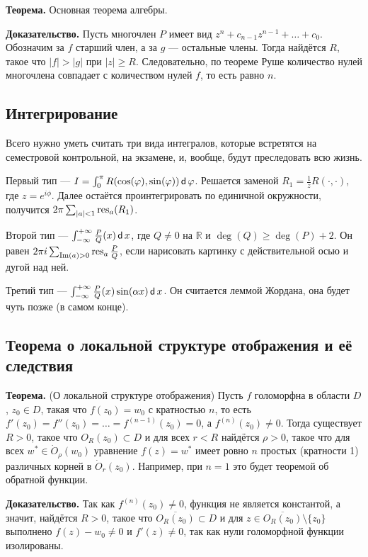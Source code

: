 \QED

\textbf{Теорема.} Основная теорема алгебры.

\textbf{Доказательство.} Пусть многочлен $P$ имеет вид $z^n + c_{n-1} z^{n-1} + \dots + c_0$.
Обозначим за $f$ старший член, а за $g$ --- остальные члены.
Тогда найдётся $R$, такое что $|f| > |g|$ при $|z| \ge R$.
Следовательно, по теореме Руше количество нулей многочлена совпадает с количеством нулей $f$, то есть равно $n$.

\QED

\subsection{Интегрирование}
Всего нужно уметь считать три вида интегралов, которые встретятся на семестровой контрольной, на экзамене, и, вообще, будут преследовать всю жизнь.

Первый тип --- $I = \int_0^\pi R(\cos(\varphi), \sin(\varphi)) \operatorname{\mathsf d} \varphi$.
Решается заменой $R_1 = \frac{1}{z} R(\cdot, \cdot)$, где $z = e^{i\phi}$.
Далее остаётся проинтегрировать по единичной окружности, получится $2\pi \sum_{|a| < 1} \operatorname{res}_a(R_1)$.

Второй тип --- $\int_{-\infty}^{+\infty} \frac{P}{Q}(x) \operatorname{\mathsf d} x$, где $Q \ne 0$ на $\mathbb R$ и $\deg(Q) \ge \deg(P) + 2$.
Он равен $2\pi i \sum_{\operatorname{Im}(a) > 0} \operatorname{res}_a \frac{P}{Q}$, если нарисовать картинку с действительной осью и дугой над ней.

Третий тип --- $\int_{-\infty}^{+\infty} \frac{P}{Q}(x) \sin(\alpha x) \operatorname{\mathsf d} x$.
Он считается леммой Жордана, она будет чуть позже (в самом конце).

\subsection{Теорема о локальной структуре отображения и её следствия}
\textbf{Теорема.} (О локальной структуре отображения) Пусть $f$ голоморфна в области $D$, $z_0 \in D$, такая что $f(z_0) = w_0$ с кратностью $n$, то есть $f'(z_0) = f''(z_0) = \dots = f^{(n-1)}(z_0) = 0$, а $f^{(n)}(z_0) \ne 0$.
Тогда существует $R > 0$, такое что $O_R(z_0) \subset D$ и для всех $r < R$ найдётся $\rho > 0$, такое что для всех $w^* \in \dot O_\rho(w_0)$ уравнение $f(z) = w^*$ имеет ровно $n$ простых (кратности 1) различных корней в $\dot O_r(z_0)$.
Например, при $n = 1$ это будет теоремой об обратной функции.

\textbf{Доказательство.} Так как $f^{(n)}(z_0) \ne 0$, функция не является константой, а значит, найдётся $R > 0$, такое что $\overline{O_R(z_0)} \subset D$ и для $z \in \overline{O_R(z_0)} \setminus \{z_0\}$ выполнено $f(z) - w_0 \ne 0$ и $f'(z) \ne 0$, так как нули голоморфной функции изолированы.

